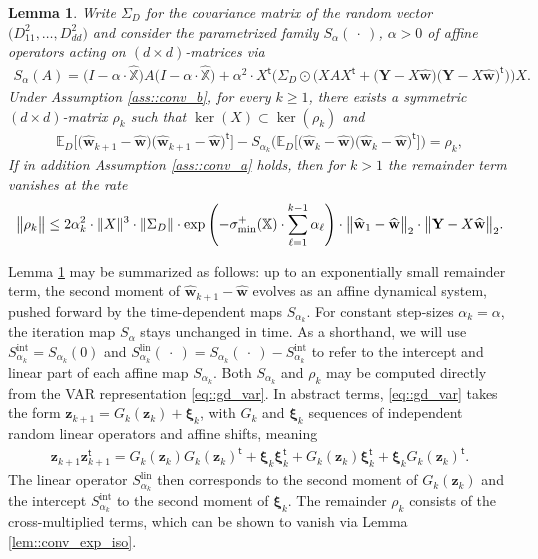\documentclass{article}
\newcommand*{\E}{\mathbb{E}} %
\newcommand*{\bbX}{\mathbb{X}}
\newcommand*{\bfY}{\mathbf{Y}}
\newcommand*{\bfw}{\mathbf{w}}
\newcommand*{\bfz}{\mathbf{z}}
\newcommand*{\tran}{^{\mathsf{t}}}
\newcommand*{\sigminp}{\sigma_{\mathrm{min}}^+}
\DeclarePairedDelimiter{\norm}{\lVert}{\rVert}
\newcommand{\whweight}{\widehat{\bfw}}
\newcommand{\whbbX}{\widehat{\bbX}}
\newcommand{\Slin}{S^{\mathrm{lin}}}
\newcommand{\Sint}{S^{\mathrm{int}}}
\newtheorem{lemma}{Lemma}[section]
\begin{document}
\begin{lemma}
  \label{lem::var_op_iso}
  Write $\Sigma_D$ for the covariance matrix of the random vector
  $\big(D_{11}^2, \ldots, D_{dd}^2\big)$ and consider the parametrized family
  $S_\alpha(\ \cdot\ )$, $\alpha > 0$ of affine operators acting on $(d \times
  d)$-matrices via \begin{align*}
    S_\alpha(A) = \big(I - \alpha \cdot \whbbX\big) A \big(I - \alpha \cdot
    \whbbX\big) + \alpha^2 \cdot X\tran \Bigg(\Sigma_D \odot \bigg(X A X\tran +
    \big(\bfY - X \whweight\big) \big(\bfY - X \whweight\big)\tran\bigg)\Bigg)
    X.
  \end{align*} Under Assumption \ref{ass::conv_b}, for every $k \geq 1$, there
  exists a symmetric $(d \times d)$-matrix $\rho_k$ such that $\ker(X) \subset
  \ker(\rho_k)$ and \begin{align*}
    \E_D\Big[\big(\whweight_{k + 1} - \whweight\big) \big(\whweight_{k + 1} -
    \whweight\big)\tran\Big] - S_{\alpha_k}\Bigg(\E_D\Big[\big(\whweight_k -
    \whweight\big) \big(\whweight_k - \whweight\big)\tran\Big]\Bigg) = \rho_k,
  \end{align*} If in addition Assumption \ref{ass::conv_a} holds, then for $k >
  1$ the remainder term vanishes at the rate \begin{align*}
    \norm[\big]{\rho_k} \leq 2 \alpha_k^2 \cdot \norm{X}^3 \cdot \norm{\Sigma_D}
    \cdot \exp \left(- \sigminp(\bbX) \cdot \sum_{\ell = 1}^{k - 1}
    \alpha_\ell\right) \cdot \norm[\big]{\whweight_1 - \whweight}_2 \cdot
    \norm[\big]{\bfY - X \whweight}_2.
  \end{align*}
\end{lemma} Lemma \ref{lem::var_op_iso} may be summarized as follows: up to an
exponentially small remainder term, the second moment of $\whweight_{k + 1} -
\whweight$ evolves as an affine dynamical system, pushed forward by the
time-dependent maps $S_{\alpha_k}$. For constant step-sizes $\alpha_k = \alpha$,
the iteration map $S_\alpha$ stays unchanged in time. As a shorthand, we will
use $\Sint_{\alpha_k} = S_{\alpha_k}(0)$ and $\Slin_{\alpha_k}(\ \cdot\ ) =
S_{\alpha_k}(\ \cdot\ )- \Sint_{\alpha_k}$ to refer to the intercept and linear
part of each affine map $S_{\alpha_k}$. Both $S_{\alpha_k}$ and $\rho_k$ may be
computed directly from the VAR representation \eqref{eq::gd_var}. In abstract
terms, \eqref{eq::gd_var} takes the form $\bfz_{k + 1} = G_k(\bfz_k) +
\bm{\xi}_k$, with $G_k$ and $\bm{\xi}_k$ sequences of independent random linear
operators and affine shifts, meaning \begin{align*}
  \bfz_{k + 1} \bfz_{k + 1}\tran = G_k(\bfz_k) G_k(\bfz_k)\tran + \bm{\xi}_k
  \bm{\xi}_k\tran + G_k(\bfz_k) \bm{\xi}_k\tran + \bm{\xi}_k G_k(\bfz_k)\tran.
\end{align*} The linear operator $\Slin_{\alpha_k}$ then corresponds to the
second moment of $G_{k}(\bfz_k)$ and the intercept $\Sint_{\alpha_k}$ to the
second moment of $\bm{\xi}_k$. The remainder $\rho_k$ consists of the
cross-multiplied terms, which can be shown to vanish via Lemma
\ref{lem::conv_exp_iso}.
\end{document}
